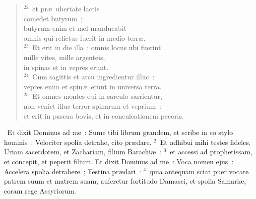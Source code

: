 \begin{flushleft}
\begin{verse}
${}^{22}$~et pr\ae\ ubertate lactis\\ comedet butyrum~;\\ butyrum enim et mel manducabit\\ omnis qui relictus fuerit in medio terr\ae .\\
${}^{23}$~Et erit in die illa~: omnis locus ubi fuerint\\ mille vites, mille argenteis,\\ in spinas et in vepres erunt.\\
${}^{24}$~Cum sagittis et arcu ingredientur illuc~:\\ vepres enim et spin\ae\ erunt in universa terra.\\
${}^{25}$~Et omnes montes qui in sarculo sarrientur,\\ non veniet illuc terror spinarum et veprium~:\\ et erit in pascua bovis, et in conculcationem pecoris.\end{verse}\end{flushleft}


~Et dixit Dominus ad me~: Sume tibi librum grandem, et scribe in eo stylo hominis~: Velociter spolia detrahe, cito pr\ae dare.
${}^{2}$~Et adhibui mihi testes fideles, Uriam sacerdotem, et Zachariam, filium Barachi\ae~:
${}^{3}$~et accessi ad prophetissam, et concepit, et peperit filium. Et dixit Dominus ad me~: Voca nomen ejus~: Accelera spolia detrahere~; Festina pr\ae dari~:
${}^{4}$~quia antequam sciat puer vocare patrem suum et matrem suam, auferetur fortitudo Damasci, et spolia Samari\ae , coram rege Assyriorum.


